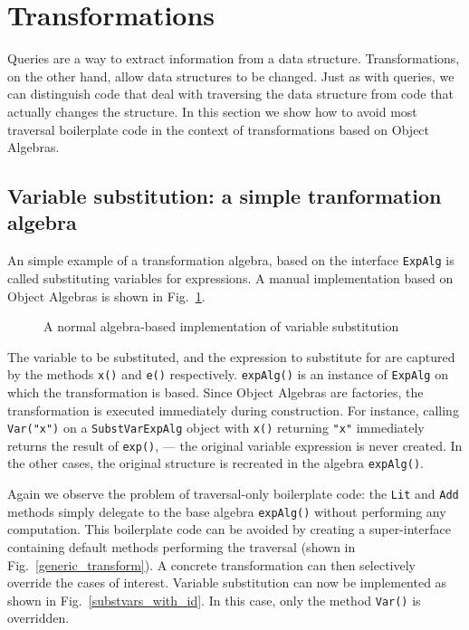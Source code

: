 \section{Transformations}\label{sec:transformations}
\label{retroimp}

Queries are a way to extract information from a data structure.
Transformations, on the other hand, allow data structures to be changed.
Just as with queries, we can distinguish code that deal with traversing the data structure from code that actually changes the structure.
In this section we show how to avoid most traversal boilerplate code in the context of transformations based on Object Algebras.


\subsection{Variable substitution: a simple tranformation algebra}\label{subsec:substvars}

An simple example of a transformation algebra, based on the interface \lstinline{ExpAlg} is called substituting variables for expressions. A manual implementation based on Object Algebras is shown in Fig.~\ref{substvars_without_id}.

\begin{figure}[!htbp]
\vspace{-.1in}
\caption{A normal algebra-based implementation of variable substitution}
\label{substvars_without_id}
\end{figure}

The variable to be substituted, and the expression to substitute for are captured by the methods \lstinline{x()} and \lstinline{e()} respectively. 
\lstinline{expAlg()} is an instance of \lstinline{ExpAlg} on which the transformation is based.
Since Object Algebras are factories, the transformation is executed immediately during construction.
For instance, calling \lstinline{Var("x")} on a \lstinline{SubstVarExpAlg} object with \lstinline{x()} returning \lstinline{"x"} immediately returns the result of \lstinline{exp()}, --- the original variable expression is never created. 
In the other cases, the original structure is recreated in the algebra \lstinline{expAlg()}.

Again we observe the problem of traversal-only boilerplate code: the \lstinline{Lit} and \lstinline{Add} methods simply delegate to the base algebra \lstinline{expAlg()} without performing any computation.
This boilerplate code can be avoided by creating a super-interface containing default methods performing the traversal (shown in Fig.~\ref{generic_transform}).
A concrete transformation can then selectively override the cases of interest.
Variable substitution can now be implemented as shown in Fig.~\ref{substvars_with_id}.
In this case, only the  method \lstinline{Var()} is overridden.


